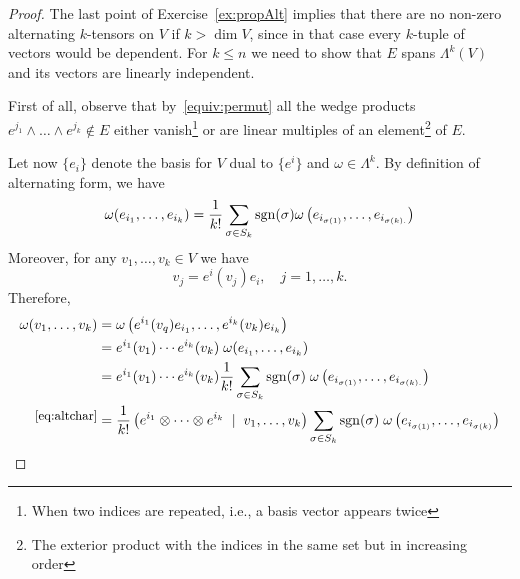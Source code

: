 \begin{proof}
  The last point of Exercise~\ref{ex:propAlt} implies that there are no non-zero alternating $k$-tensors on $V$ if $k >\dim V$, since in that case every $k$-tuple of vectors would be dependent.
  For $k\leq n$ we need to show that $E$ spans $\Lambda^k(V)$ and its vectors are linearly independent.

  First of all, observe that by~\eqref{equiv:permut} all the wedge products ${e^{j_1}\wedge\ldots\wedge e^{j_k}\not\in E}$ either vanish\footnote{When two indices are repeated, i.e., a basis vector appears twice} or are linear multiples of an element\footnote{The exterior product with the indices in the same set but in increasing order} of $E$.

  Let now $\{e_i\}$ denote the basis for $V$ dual to $\{e^i\}$ and $\omega\in\Lambda^k$.
  By definition of alternating form, we have
  \begin{equation}\label{eq:altchar}
    \omega(e_{i_1}, \ldots, e_{i_k}) = \frac1{k!} \sum_{\sigma\in S_k}\operatorname{sgn}(\sigma) \omega\left(e_{i_{\sigma(1)}}, \ldots, e_{i_{\sigma(k).}}\right)
  \end{equation}
  Moreover, for any $v_1,\ldots,v_k\in V$ we have
  \begin{equation}
    v_j = e^i(v_j) e_i, \quad j=1,\ldots, k.
  \end{equation}
  Therefore,
  \begin{align}
    \omega(v_1, \ldots, v_k)
     & =\omega\left(e^{i_1}(v_q) e_{i_1}, \ldots, e^{i_k}(v_k) e_{i_k}\right)                                                                                                                                  \\
     & =e^{i_1}(v_1)\cdots e^{i_k}(v_k)\; \omega(e_{i_1}, \ldots, e_{i_k})                                                                                                                                     \\
     & =e^{i_1}(v_1)\cdots e^{i_k}(v_k) \frac1{k!} \sum_{\sigma\in S_k}\sgn(\sigma)\; \omega\left(e_{i_{\sigma(1)}}, \ldots, e_{i_{\sigma(k).}}\right)                                                         \\
    \overset{\mbox{\small\eqref{eq:altchar}}}{}
     & = \frac1{k!} \left(e^{i_1}\otimes \cdots \otimes e^{i_k} \;\mid\; v_1, \ldots, v_k\right) \sum_{\sigma\in S_k}\sgn(\sigma)\; \omega\left(e_{i_{\sigma(1)}}, \ldots, e_{i_{\sigma(k)}}\right)            \\

\end{align}
\end{proof}
